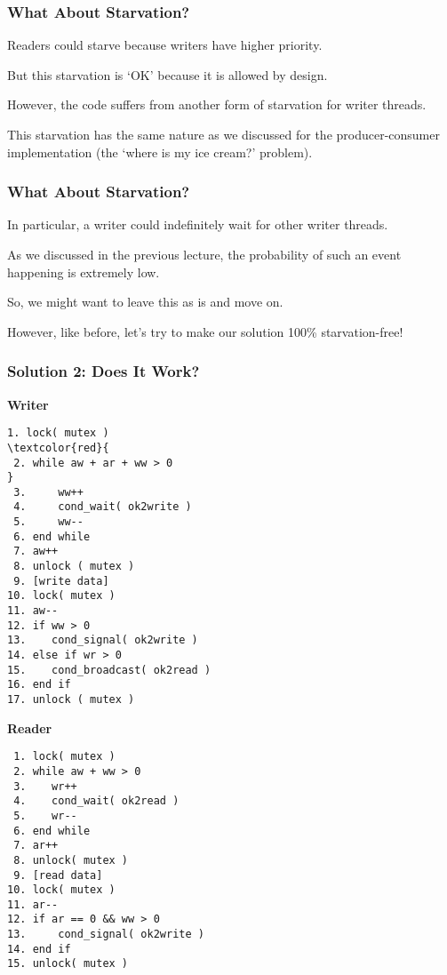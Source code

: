 \begin{frame}[fragile]
	\frametitle{What About Starvation?}
	Readers could starve because writers have higher priority.

	But this starvation is `OK' because it is allowed by design.

	However, the code suffers from another form of starvation for writer threads.

	This starvation has the same nature as we discussed for the producer-consumer implementation (the `where is my ice cream?' problem).
\end{frame}


\begin{frame}
	\frametitle{What About Starvation?}
	In particular, a writer could indefinitely wait for other writer threads.

	As we discussed in the previous lecture, the probability of such an event happening is extremely low.

	So, we might want to leave this as is and move on.

	However, like before, let's try to make our solution 100\% starvation-free!
\end{frame}


\begin{frame}[fragile]
	\frametitle{Solution 2: Does It Work?}

	\begin{multicols}{2}
		\small
		\textbf{Writer}
		\begin{Verbatim}[commandchars=\\\{\}]
 1. lock( mutex )
\textcolor{red}{
 2. while aw + ar + ww > 0
}
 3.     ww++
 4.     cond_wait( ok2write )
 5.     ww--
 6. end while
 7. aw++
 8. unlock ( mutex )
 9. [write data]
10. lock( mutex )
11. aw--
12. if ww > 0
13.    cond_signal( ok2write )
14. else if wr > 0
15.    cond_broadcast( ok2read )
16. end if
17. unlock ( mutex )
		\end{Verbatim}
		\columnbreak
		\textbf{Reader}
		\begin{verbatim}
 1. lock( mutex )
 2. while aw + ww > 0
 3.    wr++
 4.    cond_wait( ok2read )
 5.    wr--
 6. end while
 7. ar++
 8. unlock( mutex )
 9. [read data]
10. lock( mutex )
11. ar--
12. if ar == 0 && ww > 0
13.     cond_signal( ok2write )
14. end if
15. unlock( mutex )


		\end{verbatim}
	\end{multicols}
\end{frame}

